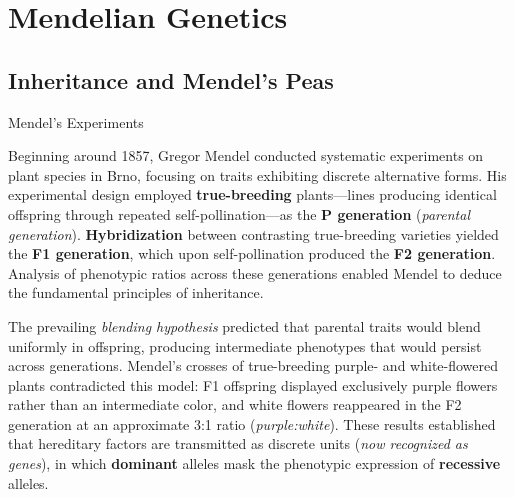 \documentclass[10pt]{article}
\begin{document}
\section{Mendelian Genetics}

  \subsection{Inheritance and Mendel's Peas}

    \begin{core}{Mendel's Experiments}

      Beginning around 1857, Gregor Mendel conducted systematic experiments on plant species in Brno, focusing on traits exhibiting discrete alternative forms. His experimental design employed \textbf{true-breeding} plants---lines producing identical offspring through repeated self-pollination---as the \textbf{P generation} (\textit{parental generation}). \textbf{Hybridization} between contrasting true-breeding varieties yielded the \textbf{F1 generation}, which upon self-pollination produced the \textbf{F2 generation}. Analysis of phenotypic ratios across these generations enabled Mendel to deduce the fundamental principles of inheritance.


      The prevailing \textit{blending hypothesis} predicted that parental traits would blend uniformly in offspring, producing intermediate phenotypes that would persist across generations. Mendel's crosses of true-breeding purple- and white-flowered plants contradicted this model: F1 offspring displayed exclusively purple flowers rather than an intermediate color, and white flowers reappeared in the F2 generation at an approximate 3:1 ratio (\textit{purple:white}). These results established that hereditary factors are transmitted as discrete units (\textit{now recognized as genes}), in which \textbf{dominant} alleles mask the phenotypic expression of \textbf{recessive} alleles.

    \end{core}
\end{document}
